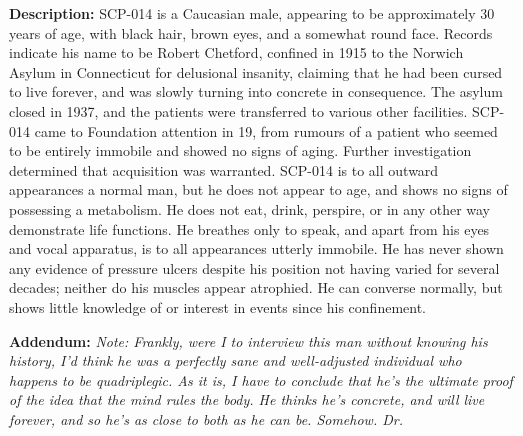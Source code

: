 \textbf{Description:} SCP-014 is a Caucasian male, appearing to be approximately 30 years of age, with black hair, brown eyes, and a somewhat round face. Records indicate his name to be Robert Chetford, confined in 1915 to the Norwich Asylum in Connecticut for delusional insanity, claiming that he had been cursed to live forever, and was slowly turning into concrete in consequence. The asylum closed in 1937, and the patients were transferred to various other facilities. SCP-014 came to Foundation attention in 19, from rumours of a patient who seemed to be entirely immobile and showed no signs of aging. Further investigation determined that acquisition was warranted.
\newpage
SCP-014 is to all outward appearances a normal man, but he does not appear to age, and shows no signs of possessing a metabolism. He does not eat, drink, perspire, or in any other way demonstrate life functions. He breathes only to speak, and apart from his eyes and vocal apparatus, is to all appearances utterly immobile. He has never shown any evidence of pressure ulcers despite his position not having varied for several decades; neither do his muscles appear atrophied. He can converse normally, but shows little knowledge of or interest in events since his confinement.

\textbf{Addendum:}\linebreak
\textsl{Note: Frankly, were I to interview this man without knowing his history, I'd think he was a perfectly sane and well-adjusted individual who happens to be quadriplegic. As it is, I have to conclude that he's the ultimate proof of the idea that the mind rules the body. He thinks he's concrete, and will live forever, and so he's as close to both as he can be. Somehow. Dr. }